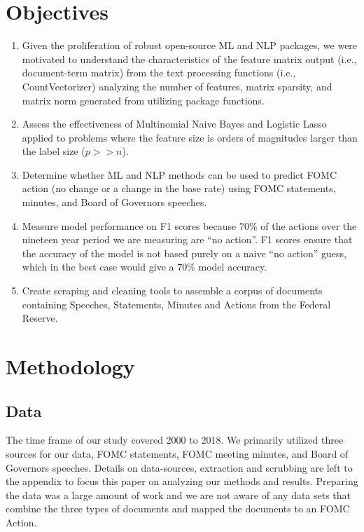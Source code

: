 \documentclass[11pt]{article}
\begin{document}
{\section{Objectives}
\begin{enumerate}
\item Given the proliferation of robust open-source ML and NLP packages, we were motivated to understand the characteristics of the feature matrix output (i.e., document-term matrix) from the text processing functions (i.e., CountVectorizer) analyzing the number of features, matrix sparsity, and matrix norm generated from utilizing package functions.
\item Assess the effectiveness of Multinomial Naive Bayes and Logistic Lasso applied to problems where the feature size is orders of magnitudes larger than the label size ($p>>n$).
\item Determine whether ML and NLP methods can be used to predict FOMC action (no change or a change in the base rate) using FOMC statements, minutes, and Board of Governors speeches.
\item Measure model performance on F1 scores because $70\%$ of the actions over the nineteen year period we are measuring are ``no action''.  F1 scores ensure that the accuracy of the model is not based purely on a naive ``no action'' guess, which in the best case would give a $70\%$ model accuracy.
\item Create scraping and cleaning tools to assemble a corpus of documents containing Speeches, Statements, Minutes and Actions from the Federal Reserve.
\end{enumerate}

\section{Methodology}

\subsection{Data}

The time frame of our study covered 2000 to 2018. We primarily utilized three sources for our data, FOMC statements, FOMC meeting minutes, and Board of Governors speeches. Details on data-sources, extraction and scrubbing are left to the appendix to focus this paper on analyzing our methods and results.  Preparing the data was a large amount of work and we are not aware of any data sets that combine the three types of documents and mapped the documents to an FOMC Action.

}
\end{document}
